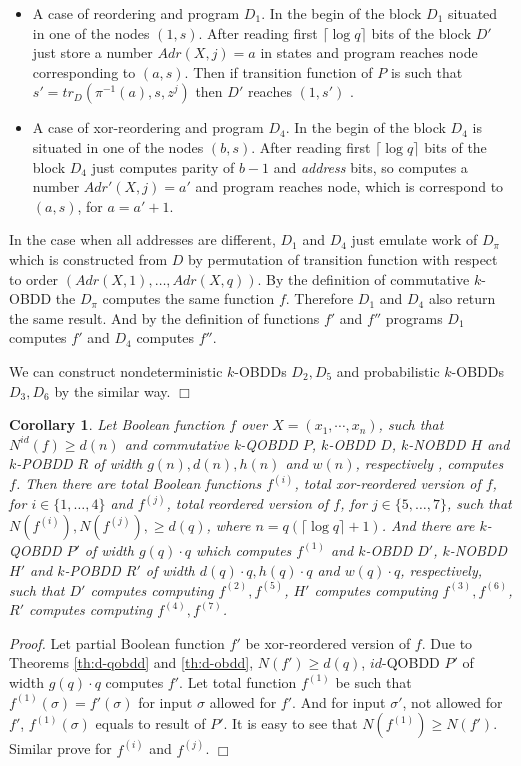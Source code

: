 \documentclass{llncs}
\newcommand{\Beginproof}{{\em Proof.}  }
\newcommand{\Endproof}{\hfill$\Box$\\}
\newtheorem{CR}[THM]{Corollary}
\begin{document}
\begin{itemize}
\item A case of reordering and program $D_1$.  In the begin of the block $D_1$ situated in one of the nodes $(1,s)$. After reading first $\lceil\log q\rceil $ bits of the block $D'$ just store a number $Adr(X,j)=a$ in states and program reaches node corresponding to $(a,s)$. Then if transition function of $P$ is such that $s'=tr_D(\pi^{-1}(a),s, z^j)$ then $D'$ reaches $(1,s')$ .

\item A case of xor-reordering  and program $D_4$.  In the begin of the block $D_4$ is situated in one of the nodes $(b,s)$. After reading first $\lceil\log q\rceil $ bits of the block $D_4$ just computes parity of $b-1$ and {\em address} bits, so computes a number $Adr'(X,j)=a'$ and program reaches node, which is correspond to $(a,s)$, for $a=a'+1$.
\end{itemize}



In the case when all addresses are different, $D_1$ and $D_4$ just emulate work of $D_{\pi}$ which is constructed from $D$ by permutation of transition function with respect to order $(Adr(X,1),\dots,Adr(X,q))$. By the definition of commutative $k$-OBDD the $D_{\pi}$ computes the same function $f$. Therefore $D_1$ and $D_4$ also return the same result. And by the definition of functions $f'$ and $f''$ programs $D_1$ computes $f'$ and $D_4$ computes $f''$.

We can construct nondeterministic $k$-OBDDs $D_2, D_5$ and probabilistic $k$-OBDDs $D_3, D_6$ by the similar way.
\Endproof

\begin{CR}\label{cr:total-reordering}
Let Boolean function $f$ over $X=(x_1, \cdots, x_n)$, such that $N^{id}(f)\geq d(n)$ and commutative k-QOBDD $P$, $k$-OBDD $D$, $k$-NOBDD $H$ and $k$-POBDD $R$ of width $g(n), d(n), h(n)$ and $w(n)$, respectively , computes $f$. Then there are total Boolean functions $f^{(i)}$, total xor-reordered version of $f$, for $i\in\{1,\dots,4\}$ and $f^{(j)}$, total reordered version of $f$, for $j\in\{5,\dots,7\}$,  such that $N(f^{(i)}), N(f^{(j)}),\geq d(q)$, where  $n=q(\lceil\log q\rceil+1)$. And there are $k$-QOBDD $P'$ of width $g(q) \cdot q$ which computes $f^{(1)}$ and $k$-OBDD $D'$, $k$-NOBDD $H'$ and $k$-POBDD $R'$ of  width $d(q)\cdot q, h(q)\cdot q$ and $w(q)\cdot q$, respectively, such that $D'$ computes computing $f^{(2)},f^{(5)}$, $H'$ computes computing $f^{(3)},f^{(6)}$, $R'$ computes computing $f^{(4)},f^{(7)}$. 
\end{CR}
\Beginproof
%
Let partial Boolean function $f'$ be xor-reordered version of $f$. Due to Theorems \ref{th:d-qobdd} and \ref{th:d-obdd}, $N(f')\geq d(q)$, $id$-QOBDD $P'$ of width $g(q) \cdot q$ computes $f'$. Let total function $f^{(1)}$ be such that $f^{(1)}(\sigma)=f'(\sigma)$ for input $\sigma$ allowed for $f'$. And for input $\sigma'$, not allowed for $f'$, $f^{(1)}(\sigma)$ equals to result of $P'$.
It is easy to see that $N(f^{(1)})\geq N(f')$. Similar prove for $f^{(i)}$ and $f^{(j)}$.
%
\Endproof
\end{document}
